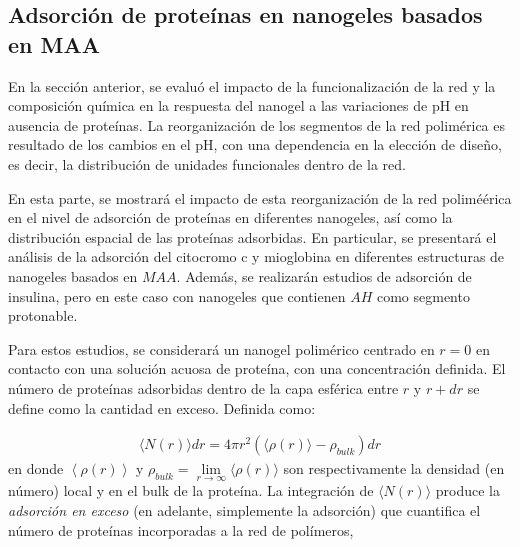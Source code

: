 \subsection{Adsorci\'on de prote\'inas en nanogeles basados en MAA}\label{sec:MAA-NGs}






En la secci\'on anterior, se evalu\'o el impacto de la funcionalizaci\'on de la red y la composici\'on qu\'imica en la respuesta del nanogel a las variaciones de pH en ausencia de prote\'inas. La reorganizaci\'on de los segmentos de la red polim\'erica es resultado de los cambios en el pH, con una dependencia en la elecci\'on de dise\~no, es decir, la distribuci\'on de unidades funcionales dentro de la red.

En esta parte, se mostrar\'a el impacto de esta reorganizaci\'on de la red polimé\'erica en el nivel de adsorci\'on de prote\'inas en diferentes nanogeles, as\'i como la distribuci\'on espacial de las prote\'inas adsorbidas. En particular, se presentar\'a el an\'alisis de la adsorci\'on del citocromo c y mioglobina en diferentes estructuras de nanogeles basados en $MAA$. Adem\'as, se realizar\'an estudios de adsorci\'on de insulina, pero en este caso con nanogeles que contienen $AH$ como segmento protonable.%

Para estos estudios, se considerar\'a un nanogel polim\'erico centrado en $r=0$ en contacto con una soluci\'on acuosa de prote\'ina, con una concentraci\'on definida. El n\'umero de prote\'inas adsorbidas dentro de la capa esf\'erica entre $r$ y $r+dr$ se define como la cantidad en exceso. 
Definida como:


\begin{align}
     \langle N(r)\rangle dr = 4\pi r^2 \left(\langle\rho(r)\rangle - \rho_{bulk}\right) dr
\end{align}
%
en donde $\left<\rho(r)\right>$ y $\rho_{bulk}=\lim\limits_{r\to \infty } \langle\rho(r)\rangle$ son respectivamente la densidad (en n\'umero) local y en el bulk de la prote\'ina.
La integraci\'on de $\langle N(r)\rangle$ produce la \emph{adsorci\'on en exceso} (en adelante, simplemente la adsorci\'on) que cuantifica el n\'umero de prote\'inas incorporadas a la red de pol\'imeros,


